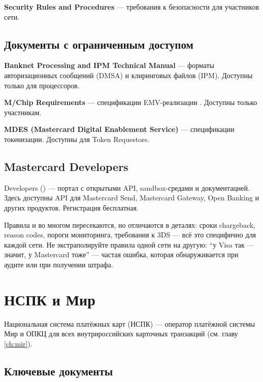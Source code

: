 \textbf{Security Rules and Procedures} — требования
к безопасности для участников сети.

\subsection*{Документы с ограниченным доступом}

\textbf{Banknet Processing and IPM Technical Manual} —
форматы авторизационных сообщений (DMSA) и клиринговых
файлов (IPM). Доступны только для процессоров.

\textbf{M/Chip Requirements} — спецификации
EMV-реализации . Доступны
только участникам.

\textbf{MDES (Mastercard Digital Enablement Service)} —
спецификации токенизации. Доступны
для Token Requestors.

\subsection*{Mastercard Developers}

 Developers
() — портал
с открытыми API, sandbox-средами и документацией.
Здесь доступны API для Mastercard Send, Mastercard
Gateway, Open Banking и других продуктов. Регистрация
бесплатная.

\begin{kaobox}[title=На практике]
  Правила  и  во многом
  пересекаются, но отличаются в деталях: сроки chargeback,
  reason codes, пороги мониторинга, требования к 3DS —
  всё это специфично для каждой сети. Не экстраполируйте
  правила одной сети на другую: \enquote{у Visa так —
    значит, у Mastercard тоже} — частая ошибка, которая
  обнаруживается при аудите или при получении штрафа.
\end{kaobox}

\section{НСПК и Мир}
\label{sec:ps-nspk}

Национальная система платёжных карт (НСПК) —
оператор платёжной системы Мир и ОПКЦ для всех
внутрироссийских карточных
транзакций (см. главу \ref{ch:mir}).

\subsection*{Ключевые документы}

